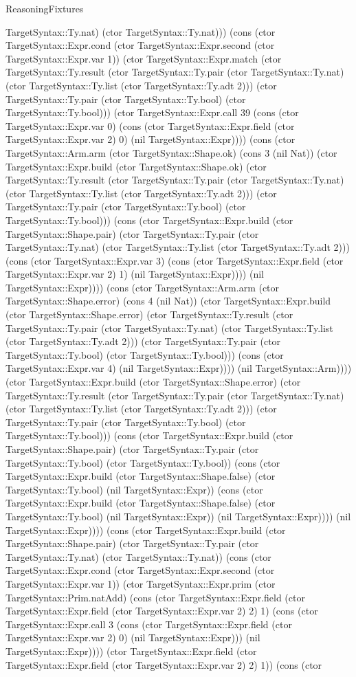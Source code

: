 \begin{lexlean}{ReasoningFixtures}
\begin{semanticmodule}
{TargetSyntax::Ty.nat) (ctor TargetSyntax::Ty.nat))) (cons (ctor TargetSyntax::Expr.cond (ctor TargetSyntax::Expr.second (ctor TargetSyntax::Expr.var 1)) (ctor TargetSyntax::Expr.match (ctor TargetSyntax::Ty.result (ctor TargetSyntax::Ty.pair (ctor TargetSyntax::Ty.nat) (ctor TargetSyntax::Ty.list (ctor TargetSyntax::Ty.adt 2))) (ctor TargetSyntax::Ty.pair (ctor TargetSyntax::Ty.bool) (ctor TargetSyntax::Ty.bool))) (ctor TargetSyntax::Expr.call 39 (cons (ctor TargetSyntax::Expr.var 0) (cons (ctor TargetSyntax::Expr.field (ctor TargetSyntax::Expr.var 2) 0) (nil TargetSyntax::Expr)))) (cons (ctor TargetSyntax::Arm.arm (ctor TargetSyntax::Shape.ok) (cons 3 (nil Nat)) (ctor TargetSyntax::Expr.build (ctor TargetSyntax::Shape.ok) (ctor TargetSyntax::Ty.result (ctor TargetSyntax::Ty.pair (ctor TargetSyntax::Ty.nat) (ctor TargetSyntax::Ty.list (ctor TargetSyntax::Ty.adt 2))) (ctor TargetSyntax::Ty.pair (ctor TargetSyntax::Ty.bool) (ctor TargetSyntax::Ty.bool))) (cons (ctor TargetSyntax::Expr.build (ctor TargetSyntax::Shape.pair) (ctor TargetSyntax::Ty.pair (ctor TargetSyntax::Ty.nat) (ctor TargetSyntax::Ty.list (ctor TargetSyntax::Ty.adt 2))) (cons (ctor TargetSyntax::Expr.var 3) (cons (ctor TargetSyntax::Expr.field (ctor TargetSyntax::Expr.var 2) 1) (nil TargetSyntax::Expr)))) (nil TargetSyntax::Expr)))) (cons (ctor TargetSyntax::Arm.arm (ctor TargetSyntax::Shape.error) (cons 4 (nil Nat)) (ctor TargetSyntax::Expr.build (ctor TargetSyntax::Shape.error) (ctor TargetSyntax::Ty.result (ctor TargetSyntax::Ty.pair (ctor TargetSyntax::Ty.nat) (ctor TargetSyntax::Ty.list (ctor TargetSyntax::Ty.adt 2))) (ctor TargetSyntax::Ty.pair (ctor TargetSyntax::Ty.bool) (ctor TargetSyntax::Ty.bool))) (cons (ctor TargetSyntax::Expr.var 4) (nil TargetSyntax::Expr)))) (nil TargetSyntax::Arm)))) (ctor TargetSyntax::Expr.build (ctor TargetSyntax::Shape.error) (ctor TargetSyntax::Ty.result (ctor TargetSyntax::Ty.pair (ctor TargetSyntax::Ty.nat) (ctor TargetSyntax::Ty.list (ctor TargetSyntax::Ty.adt 2))) (ctor TargetSyntax::Ty.pair (ctor TargetSyntax::Ty.bool) (ctor TargetSyntax::Ty.bool))) (cons (ctor TargetSyntax::Expr.build (ctor TargetSyntax::Shape.pair) (ctor TargetSyntax::Ty.pair (ctor TargetSyntax::Ty.bool) (ctor TargetSyntax::Ty.bool)) (cons (ctor TargetSyntax::Expr.build (ctor TargetSyntax::Shape.false) (ctor TargetSyntax::Ty.bool) (nil TargetSyntax::Expr)) (cons (ctor TargetSyntax::Expr.build (ctor TargetSyntax::Shape.false) (ctor TargetSyntax::Ty.bool) (nil TargetSyntax::Expr)) (nil TargetSyntax::Expr)))) (nil TargetSyntax::Expr)))) (cons (ctor TargetSyntax::Expr.build (ctor TargetSyntax::Shape.pair) (ctor TargetSyntax::Ty.pair (ctor TargetSyntax::Ty.nat) (ctor TargetSyntax::Ty.nat)) (cons (ctor TargetSyntax::Expr.cond (ctor TargetSyntax::Expr.second (ctor TargetSyntax::Expr.var 1)) (ctor TargetSyntax::Expr.prim (ctor TargetSyntax::Prim.natAdd) (cons (ctor TargetSyntax::Expr.field (ctor TargetSyntax::Expr.field (ctor TargetSyntax::Expr.var 2) 2) 1) (cons (ctor TargetSyntax::Expr.call 3 (cons (ctor TargetSyntax::Expr.field (ctor TargetSyntax::Expr.var 2) 0) (nil TargetSyntax::Expr))) (nil TargetSyntax::Expr)))) (ctor TargetSyntax::Expr.field (ctor TargetSyntax::Expr.field (ctor TargetSyntax::Expr.var 2) 2) 1)) (cons (ctor }
\end{semanticmodule}
\end{lexlean}
